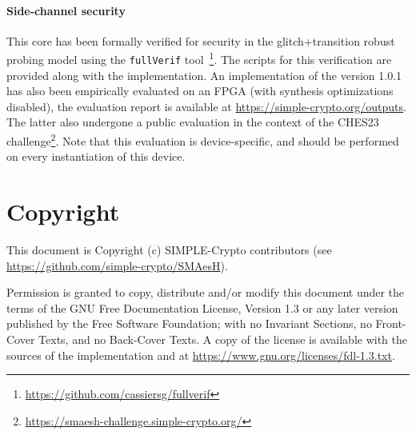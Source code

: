 \documentclass{scrartcl}
\begin{document}
\paragraph{Side-channel security}
This core has been formally verified for security in the glitch+transition
robust probing model using the \texttt{fullVerif}%
tool~\cite{DBLP:journals/tc/CassiersGLS21,DBLP:journals/tches/CassiersS21}\footnote{\url{https://github.com/cassiersg/fullverif}}.
The scripts for this verification are provided along with the implementation.
An implementation of the version 1.0.1 has also been empirically evaluated on
an FPGA (with synthesis optimizations disabled), the evaluation report is
available at \url{https://simple-crypto.org/outputs}. The latter also undergone
a public evaluation in the context of the CHES23
challenge\footnote{\url{https://smaesh-challenge.simple-crypto.org/}}. Note that this
evaluation is device-specific, and should be performed on every instantiation
of this device.

\section{Copyright}

This document is Copyright (c) SIMPLE-Crypto contributors (see \url{https://github.com/simple-crypto/SMAesH}).

Permission is granted to copy, distribute and/or modify this document under the
terms of the GNU Free Documentation License, Version 1.3 or any later version
published by the Free Software Foundation; with no Invariant Sections, no
Front-Cover Texts, and no Back-Cover Texts.
A copy of the license is available with the sources of the implementation and
at \url{https://www.gnu.org/licenses/fdl-1.3.txt}.



\end{document}
